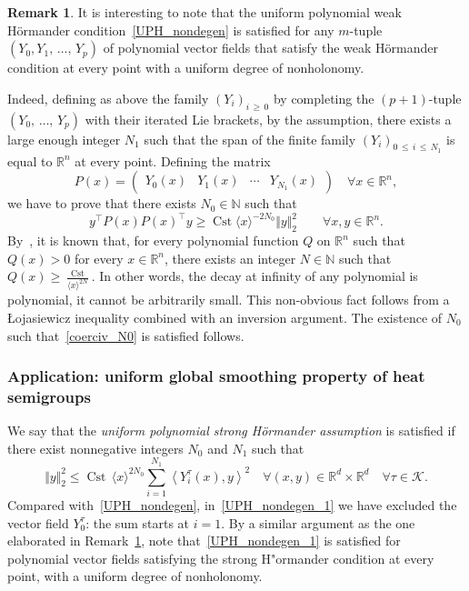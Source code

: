 \documentclass[10pt]{amsart}
\theoremstyle{definition}\newtheorem{defi}[theo]{Definition}\newtheorem{rema}[theo]{Remark}\newtheorem{exam}[theo]{Example}\newtheorem{exem}[theo]{Example}\newtheorem{nota}[theo]{Notation}
\newcommand*\R{\mathbb{R}}
\newcommand*\N{\mathbb{N}}
\newcommand{\calK}{\mathcal{K}}
\DeclareMathOperator{\Cst}{Cst}
\renewcommand{\geq}{\geqslant}
\renewcommand{\leq}{\leqslant}
\let\oldforall\forall
\renewcommand*{\forall}{\mathrel{\oldforall}}
\begin{document}
\begin{rema}\label{rem_polynomial_Hormander}
It is interesting to note that the uniform polynomial weak H\"ormander condition~\eqref{UPH_nondegen} is satisfied for any $m$-tuple $(Y_0,Y_1,\,\ldots,\,Y_p)$ of polynomial vector fields that satisfy the weak H\"ormander condition at every point with a uniform degree of nonholonomy.

Indeed, defining as above the family $(Y_i)_{i\,\geq\,0}$ by completing the $(p+1)$-tuple $(Y_0,\,\ldots,\,Y_p)$ with their iterated Lie brackets, by the assumption, there exists a large enough integer $N_1$ such that the span of the finite family $(Y_i)_{0\,\leq\,i\,\leq\,N_1}$ is equal to $\R^n$ at every point. Defining the matrix
\[
P(x) =
\begin{pmatrix}
Y_0(x) & Y_1(x) & \cdots & Y_{N_1}(x)
\end{pmatrix} \quad \forall x\in\R^n,
\]
we have to prove that there exists $N_0\in\N$ such that
\begin{equation}\label{coerciv_N0}
y^\top P(x) P(x)^\top y \geq \Cst \langle x\rangle^{-2N_0} \Vert y\Vert_2^2\qquad \forall x,y\in\R^n.
\end{equation}
By~\cite[Lemma~2]{Ho-58}, it is known that, for every polynomial function $Q$ on $\R^n$ such that $Q(x)>0$ for every $x\in\R^n$, there exists an integer $N\in\N$ such that $Q(x)\geq \tfrac{\Cst}{\langle x\rangle^{2N}}$. In other words, the decay at infinity of any polynomial is polynomial, it cannot be arbitrarily small. This non-obvious fact follows from a \L{}ojasiewicz inequality combined with an inversion argument. The existence of $N_0$ such that~\eqref{coerciv_N0} is satisfied follows.
\end{rema}



\subsubsection{Application: uniform global smoothing property of heat semigroups}\label{sec:globalregheat}
We say that the \emph{uniform polynomial strong H\"ormander assumption} is satisfied if there exist nonnegative integers $N_0$ and $N_1$ such that
\begin{equation}\label{UPH_nondegen_1}
\Vert y\Vert_2^2 \leq \Cst\, \langle x\rangle^{2N_0} \sum_{i=1}^{N_1} \left\langle Y_i^\tau(x),y\right\rangle^2
\quad \forall (x,y)\in\R^d\times\R^d\quad\forall \tau\in\calK.
\end{equation}
Compared with~\eqref{UPH_nondegen}, in~\eqref{UPH_nondegen_1} we have excluded the vector field $Y_0^\tau$: the sum starts at $i=1$. By a similar argument as the one elaborated in Remark~\ref{rem_polynomial_Hormander}, note that~\eqref{UPH_nondegen_1} is satisfied for polynomial vector fields satisfying the strong H"ormander condition at every point, with a uniform degree of nonholonomy.
\end{document}
